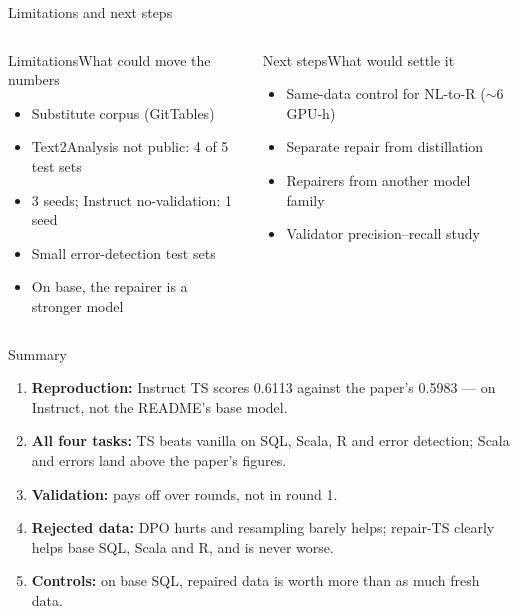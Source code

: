 \documentclass[11pt,aspectratio=169]{beamer}
\begin{document}
\begin{frame}{Limitations and next steps}
\vspace{0.15cm}
\begin{columns}[T]
\begin{tscard}[tsred]{Limitations}{What could move the numbers}
\begin{itemize}\setlength{\itemsep}{0pt}
\item Substitute corpus (GitTables)
\item Text2Analysis not public: 4 of 5 test sets
\item 3 seeds; Instruct no-validation: 1 seed
\item Small error-detection test sets
\item On base, the repairer is a stronger model
\end{itemize}
\end{tscard}
\begin{tscard}[tsnavy]{Next steps}{What would settle it}
\begin{itemize}\setlength{\itemsep}{0pt}
\item Same-data control for NL-to-R ($\sim$6 GPU-h)
\item Separate repair from distillation
\item Repairers from another model family
\item Validator precision--recall study
\end{itemize}
\end{tscard}
\end{columns}
\end{frame}

\begin{frame}{Summary}
\vspace{0.15cm}
\begin{enumerate}\setlength{\itemsep}{0.45em}
\item \textbf{Reproduction:} Instruct TS scores 0.6113 against the paper's 0.5983 --- on Instruct, not the README's base model.
\item \textbf{All four tasks:} TS beats vanilla on SQL, Scala, R and error detection; Scala and errors land above the paper's figures.
\item \textbf{Validation:} pays off over rounds, not in round 1.
\item \textbf{Rejected data:} DPO hurts and resampling barely helps; \alert{repair-TS} clearly helps base SQL, Scala and R, and is never worse.
\item \textbf{Controls:} on base SQL, repaired data is worth more than as much fresh data.
\end{enumerate}
\end{frame}
\end{document}

